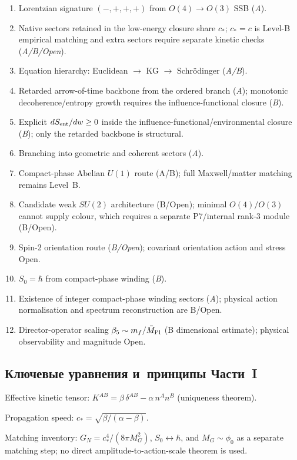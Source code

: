 \documentclass[11pt,a4paper]{article}
\begin{document}
\begin{enumerate}
\item Lorentzian signature $(-,+,+,+)$ from $O(4)\to O(3)$ SSB (\emph{A}).
\item Native sectors retained in the low-energy closure share $c_*$; $c_*=c$ is Level-B empirical matching and extra sectors require separate kinetic checks (\emph{A/B/Open}).
\item Equation hierarchy: Euclidean $\to$ KG $\to$ Schr\"odinger (\emph{A/B}).
\item Retarded arrow-of-time backbone from the ordered branch (\emph{A}); monotonic decoherence/entropy growth requires the influence-functional closure (\emph{B}).
\item Explicit $dS_{\rm ent}/dw\ge0$ inside the influence-functional/environmental closure (\emph{B}); only the retarded backbone is structural.
\item Branching into geometric and coherent sectors (\emph{A}).
\item Compact-phase Abelian $U(1)$ route (A/B); full Maxwell/matter matching remains Level~B.
\item Candidate weak $SU(2)$ architecture (B/Open); minimal $O(4)/O(3)$ cannot supply colour, which requires a separate P7/internal rank-3 module (B/Open).
\item Spin-2 orientation route (\emph{B/Open}); covariant orientation action and stress Open.
\item $S_0 = \hbar$ from compact-phase winding (\emph{B}).
\item Existence of integer compact-phase winding sectors (\emph{A}); physical action normalisation and spectrum reconstruction are B/Open.
\item Director-operator scaling $\beta_5\sim m_f/\bar M_{\rm Pl}$ (B dimensional estimate); physical observability and magnitude Open.
\end{enumerate}

\subsection{Ключевые уравнения и~принципы Части~I}

Effective kinetic tensor: $K^{AB} = \beta\,\delta^{AB} - \alpha\,n^An^B$ (uniqueness theorem).

Propagation speed: $c_* = \sqrt{\beta/(\alpha-\beta)}$.

Matching inventory: $G_N=c_*^4/(8\pi M_G^2)$, $S_0\leftrightarrow\hbar$, and $M_G\sim\phi_0$ as a separate matching step; no direct amplitude-to-action-scale theorem is used.
\end{document}
